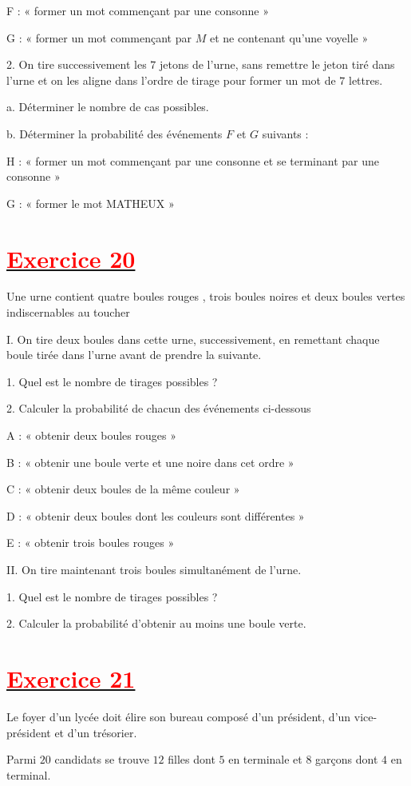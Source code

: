 \documentclass[12pt]{article}
\begin{document}
F : « former un mot commençant par une consonne »

G : « former un mot commençant par $M$ et ne contenant qu'une voyelle »

2. On tire successivement les $7$ jetons de l'urne, sans remettre le jeton tiré dans l'urne et on les aligne dans l'ordre de tirage pour former un mot de $7$ lettres.

a. Déterminer le nombre de cas possibles.

b. Déterminer la probabilité des événements $F$ et $G$ suivants :

H : « former un mot commençant par une consonne et se terminant par une consonne »

G : « former le mot MATHEUX »
\section*{\underline{\textbf{\textcolor{red}{Exercice 20}}}}
Une urne contient quatre boules rouges , trois boules noires et deux boules vertes indiscernables au toucher

I. On tire deux boules dans cette urne, successivement, en remettant chaque boule tirée dans l'urne avant de prendre la suivante.

1. Quel est le nombre de tirages possibles ?

2. Calculer la probabilité de chacun des événements ci-dessous

A : « obtenir deux boules rouges »

B : « obtenir une boule verte et une noire dans cet ordre »

C : « obtenir deux boules de la même couleur »

D : « obtenir deux boules dont les couleurs sont différentes »

E : « obtenir trois boules rouges »

II. On tire maintenant trois boules simultanément de l'urne.

1. Quel est le nombre de tirages possibles ?

2. Calculer la probabilité d’obtenir au moins une boule verte.
\section*{\underline{\textbf{\textcolor{red}{Exercice 21}}}}
Le foyer d'un lycée doit élire son bureau composé d'un président, d'un vice- président et d'un trésorier.

Parmi $20$ candidats se trouve $12$ filles dont $5$ en terminale et $8$ garçons dont $4$ en terminal. 
\end{document}
